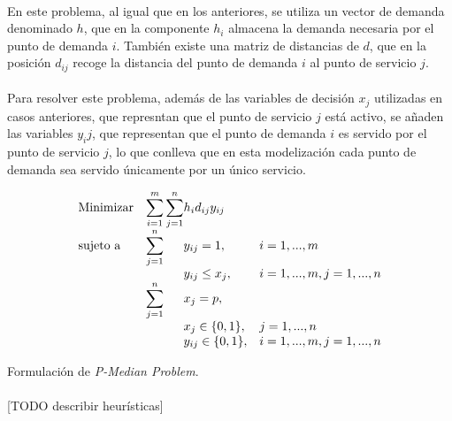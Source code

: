 \documentclass[spanish]{article}
\begin{document}
		\paragraph{}
		En este problema, al igual que en los anteriores, se utiliza un vector de demanda denominado $h$, que en la componente $h_{i}$ almacena la demanda necesaria por el punto de demanda $i$. También existe una matriz de distancias de $d$, que en la posición $d_{ij}$ recoge la distancia del punto de demanda $i$ al punto de servicio $j$.

		\paragraph{}
		Para resolver este problema, además de las variables de decisión $x_j$ utilizadas en casos anteriores, que represntan que el punto de servicio $j$ está activo, se añaden las variables $y_ij$, que representan que el punto de demanda $i$ es servido por el punto de servicio $j$, lo que conlleva que en esta modelización cada punto de demanda sea servido únicamente por un único servicio.

		\begin{eqfloat}
			\begin{equation}
				\begin{array}{ll@{}ll}
					\text{Minimizar}
						& \displaystyle\sum\limits_{i = 1}^m
							\displaystyle\sum\limits_{j = 1}^n	& h_i d_{ij} y_{ij}	&							\\
					\text{sujeto a}
						& \displaystyle\sum\limits_{j = 1}^n 	& y_{ij} = 1,		& i = 1,..., m	\\
						& 																	 	& y_{ij} \leq x_{j},  		& i=1 ,..., m,j=1 ,..., n  \\
						& \displaystyle\sum\limits_{j = 1}^n 	& x_{j} = p,  		& 						\\
						&                                     &	x_{j} \in \{0,1\},&j=1 ,..., n 	\\
						&                                     &	y_{ij} \in \{0,1\},&i=1 ,..., m, j=1 ,..., n  \\
				\end{array}
			\end{equation}
			\caption{Formulación de \emph{P-Median Problem}.}
      \label{eq:p_median}
    \end{eqfloat}

		\paragraph{}
		[TODO describir heurísticas]
\end{document}
